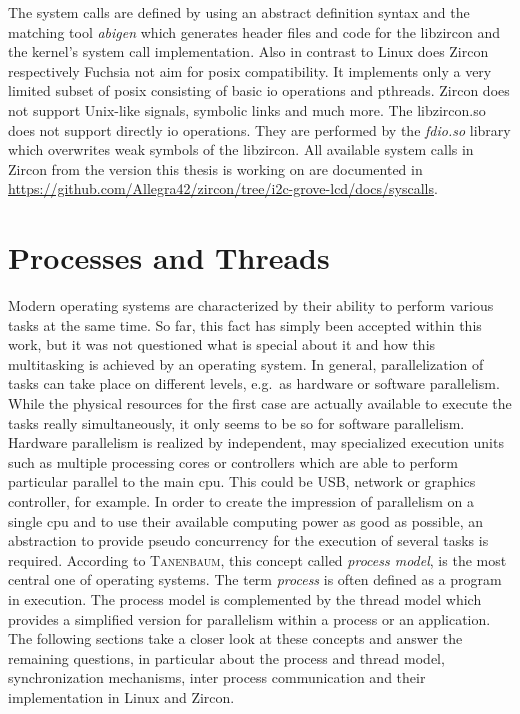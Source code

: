 The system calls are defined by using an abstract definition syntax and the matching tool \textit{abigen} which generates header files and code for the libzircon and the kernel's system call implementation\cite{zircon-concepts}.
Also in contrast to Linux does Zircon respectively Fuchsia not aim for \ac{posix} compatibility.
It implements only a very limited subset of \ac{posix} consisting of basic \ac{io} operations and pthreads.
Zircon does not support Unix-like signals, symbolic links and much more\cite{zircon-libc-posix}.
The libzircon.so does not support directly \ac{io} operations. 
They are performed by the \textit{fdio.so} library which overwrites weak symbols of the libzircon\cite{zircon-libc-posix}.
All available system calls in Zircon from the version this thesis is working on are documented in \url{https://github.com/Allegra42/zircon/tree/i2c-grove-lcd/docs/syscalls}. 

\section{Processes and Threads}\label{sec:processes-threads}

Modern operating systems are characterized by their ability to perform various tasks at the same time.
So far, this fact has simply been accepted within this work, but it was not questioned what is special about it and how this multitasking is achieved by an operating system.
In general, parallelization of tasks can take place on different levels, e.g.\ as hardware or software parallelism.
While the physical resources for the first case are actually available to execute the tasks really simultaneously, it only seems to be so for software parallelism\cite{glatz2015betriebssysteme}.
Hardware parallelism is realized by independent, may specialized execution units such as multiple processing cores or controllers which are able to perform particular parallel to the main \ac{cpu}.
This could be USB, network or graphics controller, for example\cite{glatz2015betriebssysteme}.
In order to create the impression of parallelism on a single \ac{cpu} and to use their available computing power as good as possible, an abstraction to provide pseudo concurrency for the execution of several tasks is required.
According to \textsc{Tanenbaum}, this concept called \textit{process model}, is the most central one of operating systems\cite{tanenbaum-modern-operating-systems}.
The term \textit{process} is often defined as a program in execution\cite{achilles2006betriebssysteme}.
The process model is complemented by the thread model which provides a simplified version for parallelism within a process or an application\cite{glatz2015betriebssysteme}.
The following sections take a closer look at these concepts and answer the remaining questions, in particular about the process and thread model, synchronization mechanisms, inter process communication and their implementation in Linux and Zircon.


